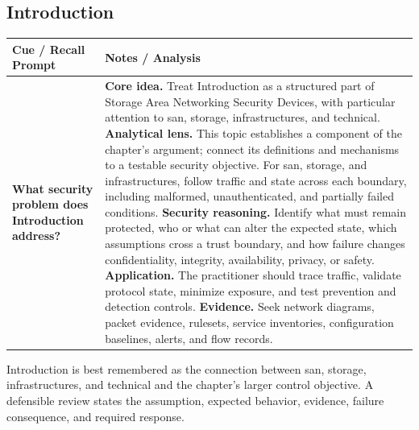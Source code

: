 \documentclass[11pt]{article}
\newcommand{\CornellHeader}{%
\rowcolor{Navy}\color{white}\bfseries Cue / Recall Prompt & \color{white}\bfseries Notes / Analysis\\\hline}
\newcommand{\CornellRow}[2]{%
\cellcolor{CueGray}\RaggedRight\textbf{#1} & \RaggedRight #2\\\hline}
\begin{document}
\subsection*{Introduction}
\begin{longtable}{>{\RaggedRight\arraybackslash}p{}|>{\RaggedRight\arraybackslash}p{}}
\CornellHeader
\CornellRow{What security problem does Introduction address?}{\textbf{Core idea.} Treat Introduction as a structured part of Storage Area Networking Security Devices, with particular attention to san, storage, infrastructures, and technical. \textbf{Analytical lens.} This topic establishes a component of the chapter's argument; connect its definitions and mechanisms to a testable security objective. For san, storage, and infrastructures, follow traffic and state across each boundary, including malformed, unauthenticated, and partially failed conditions. \textbf{Security reasoning.} Identify what must remain protected, who or what can alter the expected state, which assumptions cross a trust boundary, and how failure changes confidentiality, integrity, availability, privacy, or safety. \textbf{Application.} The practitioner should trace traffic, validate protocol state, minimize exposure, and test prevention and detection controls. \textbf{Evidence.} Seek network diagrams, packet evidence, rulesets, service inventories, configuration baselines, alerts, and flow records.}
\end{longtable}
\begin{topicsummary}
Introduction is best remembered as the connection between san, storage, infrastructures, and technical and the chapter's larger control objective. A defensible review states the assumption, expected behavior, evidence, failure consequence, and required response.
\end{topicsummary}
\end{document}
